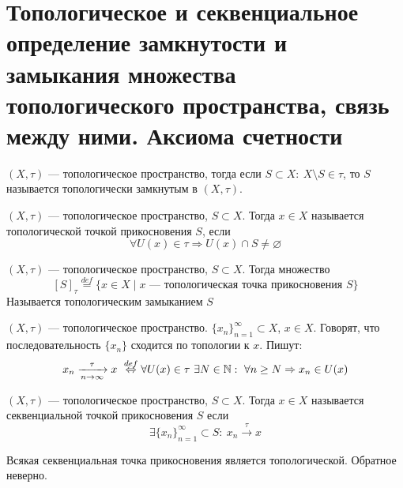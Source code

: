 \newpage
\section{Топологическое и секвенциальное определение замкнутости и замыкания множества топологического пространства, связь между ними. Аксиома счетности}
\begin{definition}
	$(X,\tau)$ --- топологическое пространство, тогда если $S \subset X: \ X \setminus S \in \tau$, то $S$ называется топологически замкнутым в $(X,\tau)$.
\end{definition}
\begin{definition}
	$(X, \tau)$ --- топологическое пространство, $S \subset X$. Тогда $x \in X$ называется топологической точкой прикосновения $S$, если 
	$$
	\forall U(x) \in \tau \Rightarrow U(x) \cap S \neq \varnothing
	$$
\end{definition}
\begin{definition}
	$(X,\tau)$ --- топологическое пространство, $S \subset X$. Тогда множество
	$$
	[S]_\tau \stackrel{def}= \{x \in X \mid x \text{ --- топологическая точка прикосновения } S \}
	$$
	Называется топологическим замыканием $S$
\end{definition}
\begin{definition}
	$(X, \tau)$ --- топологическое пространство. $\{x_n\}_{n=1}^\infty \subset X$, $x \in X$. Говорят, что последовательность $\{x_n\}$ сходится по топологии к $x$. Пишут:
	$$
	x_n \xrightarrow[n \to \infty]{\tau} x \  \stackrel{def}\Leftrightarrow \forall U(x) \in \tau \ \exists N \in \mathbb{N} : \ \forall n \geq N \Rightarrow x_n \in U(x)
	$$
\end{definition}
\begin{definition}
	$(X,\tau)$	 --- топологическое пространство, $S \subset X$. Тогда $x \in X$ называется секвенциальной точкой прикосновения $S$ если
	$$
	\exists \{x_n\}_{n=1}^\infty \subset S : \ x_n \stackrel{\tau}{\longrightarrow} x 
	$$
\end{definition}
\begin{claim}
	Всякая секвенциальная точка прикосновения является топологической. Обратное неверно.
\end{claim}
